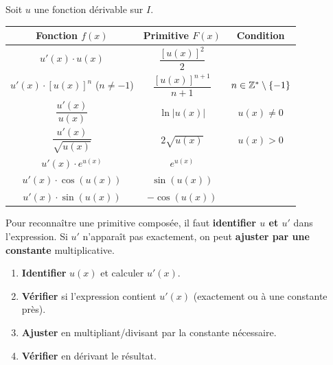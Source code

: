 \begin{propriete}
  Soit $u$ une fonction d\'{e}rivable sur $I$.

  \bigskip
  \begin{center}
  \renewcommand{\arraystretch}{2.4}
  \begin{tabular}{|c|c|c|}
    \hline
    \textbf{\color{forest}Fonction $f(x)$}
      & \textbf{\color{forest}Primitive $F(x)$}
      & \textbf{\color{forest}Condition} \\
    \hline\hline
    $u'(x) \cdot u(x)$
      & $\dfrac{[u(x)]^2}{2}$
      & \\
    \hline
    $u'(x) \cdot [u(x)]^n$ \; ($n \neq -1$)
      & $\dfrac{[u(x)]^{n+1}}{n+1}$
      & $n \in \mathbb{Z}^*\setminus\{-1\}$ \\
    \hline
    $\dfrac{u'(x)}{u(x)}$
      & $\ln|u(x)|$
      & $u(x) \neq 0$ \\
    \hline
    $\dfrac{u'(x)}{\sqrt{u(x)}}$
      & $2\sqrt{u(x)}$
      & $u(x) > 0$ \\
    \hline
    $u'(x) \cdot e^{u(x)}$
      & $e^{u(x)}$
      & \\
    \hline
    $u'(x) \cdot \cos(u(x))$
      & $\sin(u(x))$
      & \\
    \hline
    $u'(x) \cdot \sin(u(x))$
      & $-\cos(u(x))$
      & \\
    \hline
  \end{tabular}
  \end{center}
\end{propriete}

\begin{attention}
  Pour reconna\^{i}tre une primitive compos\'{e}e, il faut \textbf{identifier $u$ et $u'$}
  dans l'expression. Si $u'$ n'appara\^{i}t pas exactement, on peut
  \textbf{ajuster par une constante} multiplicative.
\end{attention}

\begin{methode}
  \begin{enumerate}
    \item \textbf{Identifier} $u(x)$ et calculer $u'(x)$.
    \item \textbf{V\'{e}rifier} si l'expression contient $u'(x)$ (exactement
          ou \`{a} une constante pr\`{e}s).
    \item \textbf{Ajuster} en multipliant/divisant par la constante
          n\'{e}cessaire.
    \item \textbf{V\'{e}rifier} en d\'{e}rivant le r\'{e}sultat.
  \end{enumerate}
\end{methode}

